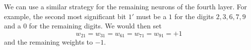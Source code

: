 \begin{solution}
We can use a similar strategy for the remaining neurons of the fourth layer. For 
example, the second most significant bit $1'$ must be a $1$ for the digits 
$2, 3, 6, 7, 9$ and a $0$ for the remaining digits. We would then set 
\[ 
w_{2 1} = w_{3 1} = w_{6 1} = w_{7 1} = w_{9 1} = +1 
\]
and the remaining weights to $-1$. 
\end{solution}
